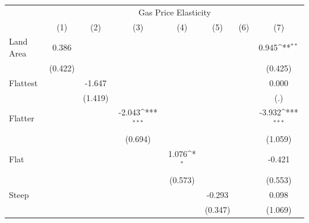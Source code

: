 {
\def\sym#1{\ifmmode^{#1}\else\(^{#1}\)\fi}
\begin{tabular}{l*{7}{c}}
\hline\hline
            &\multicolumn{7}{c}{Gas Price Elasticity}                                                                                                                 \\
            &\multicolumn{1}{c}{(1)}         &\multicolumn{1}{c}{(2)}         &\multicolumn{1}{c}{(3)}         &\multicolumn{1}{c}{(4)}         &\multicolumn{1}{c}{(5)}         &\multicolumn{1}{c}{(6)}         &\multicolumn{1}{c}{(7)}         \\
\hline
Land Area   &       0.386         &                     &                     &                     &                     &                     &       0.945\sym{**} \\
            &     (0.422)         &                     &                     &                     &                     &                     &     (0.425)         \\
[1em]
Flattest    &                     &      -1.647         &                     &                     &                     &                     &       0.000         \\
            &                     &     (1.419)         &                     &                     &                     &                     &         (.)         \\
[1em]
Flatter     &                     &                     &      -2.043\sym{***}&                     &                     &                     &      -3.932\sym{***}\\
            &                     &                     &     (0.694)         &                     &                     &                     &     (1.059)         \\
[1em]
Flat        &                     &                     &                     &       1.076\sym{*}  &                     &                     &      -0.421         \\
            &                     &                     &                     &     (0.573)         &                     &                     &     (0.553)         \\
[1em]
Steep       &                     &                     &                     &                     &      -0.293         &                     &       0.098         \\
            &                     &                     &                     &                     &     (0.347)         &                     &     (1.069)         \\

\end{tabular}}
